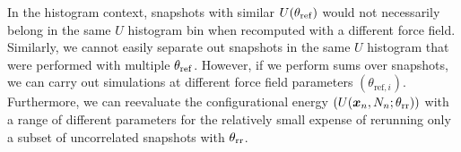 \documentclass[journal=jced,manuscript=article]{achemso}
\newcommand{\bfv}[1]{{\mbox{\boldmath{$#1$}}}}
\newcommand{\x}{\bfv{x}}
\begin{document}
%
%
In the histogram context, snapshots with similar $U(\theta_{\rm ref})$ would not necessarily belong in the same $U$ histogram bin when recomputed with a different force field. Similarly, we cannot easily separate out snapshots in the same $U$ histogram that were performed with multiple $\theta_{\rm ref}$. However, if we perform sums over snapshots, we can carry out simulations at different force field parameters $(\theta_{\mathrm{ref},i})$. Furthermore, we can reevaluate the configurational energy $(U(\x_{n},N_n;\theta_{\rm rr}))$ with a range of different parameters for the relatively small expense of rerunning only a subset of uncorrelated snapshots with $\theta_{\rm rr}$.

\end{document}
